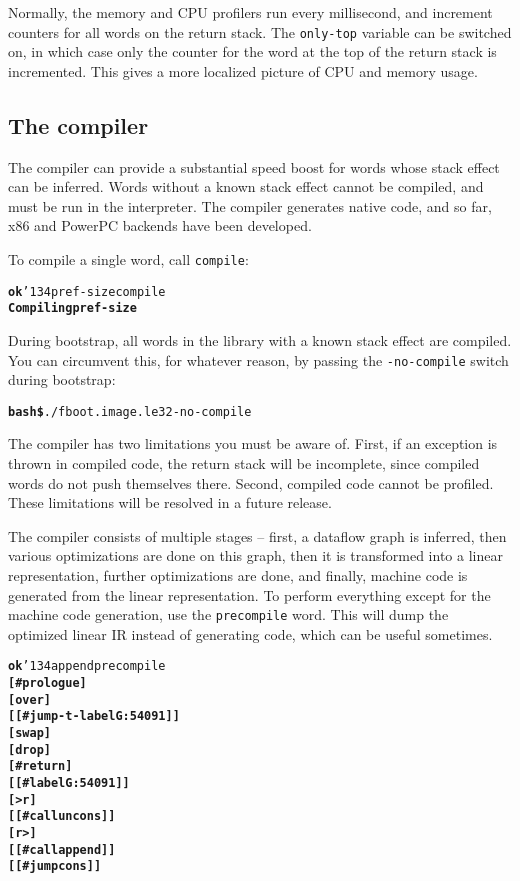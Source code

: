 \documentclass{book}
\newcommand{\bs}{\char'134}
\begin{document}
Normally, the memory and CPU profilers run every millisecond, and increment counters for all words on the return stack. The \texttt{only-top} variable can be switched on, in which case only the counter for the word at the top of the return stack is incremented. This gives a more localized picture of CPU and memory usage.

\subsection{The compiler}\label{compiler}

The compiler can provide a substantial speed boost for words whose stack effect can be inferred. Words without a known stack effect cannot be compiled, and must be run in the interpreter. The compiler generates native code, and so far, x86 and PowerPC backends have been developed.

To compile a single word, call \texttt{compile}:

\begin{alltt}
\textbf{ok} \bs pref-size compile
\textbf{Compiling pref-size}
\end{alltt}

During bootstrap, all words in the library with a known stack effect are compiled. You can
circumvent this, for whatever reason, by passing the \texttt{-no-compile} switch during
bootstrap:

\begin{alltt}
\textbf{bash\$} ./f boot.image.le32 -no-compile
\end{alltt}

The compiler has two limitations you must be aware of. First, if an exception is thrown in compiled code, the return stack will be incomplete, since compiled words do not push themselves there. Second, compiled code cannot be profiled. These limitations will be resolved in a future release.

The compiler consists of multiple stages -- first, a dataflow graph is inferred, then various optimizations are done on this graph, then it is transformed into a linear representation, further optimizations are done, and finally, machine code is generated from the linear representation. To perform everything except for the machine code generation, use the \texttt{precompile} word. This will dump the optimized linear IR instead of generating code, which can be useful sometimes.

\begin{alltt}
\textbf{ok} \bs append precompile
\textbf{[ \#prologue ]
[ over ]
[[ \#jump-t-label G:54091 ]]
[ swap ]
[ drop ]
[ \#return ]
[[ \#label G:54091 ]]
[ >r ]
[[ \#call uncons ]]
[ r> ]
[[ \#call append ]]
[[ \#jump cons ]]}
\end{alltt}

\printglossary


\end{document}
